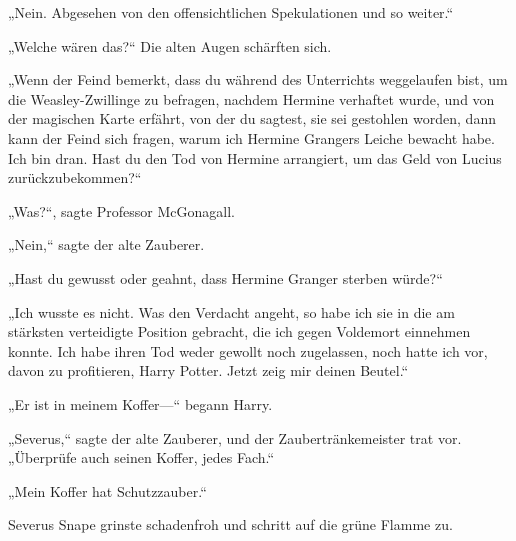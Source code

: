 „Nein. Abgesehen von den offensichtlichen Spekulationen und so weiter.“

„Welche wären das?“
Die alten Augen schärften sich.

„Wenn der Feind bemerkt, dass du während des Unterrichts weggelaufen bist, um die Weasley-Zwillinge zu befragen, nachdem Hermine verhaftet wurde, und von der magischen Karte erfährt, von der du sagtest, sie sei gestohlen worden, dann kann der Feind sich fragen, warum ich Hermine Grangers Leiche bewacht habe. Ich bin dran. Hast du den Tod von Hermine arrangiert, um das Geld von Lucius zurückzubekommen?“

„Was?“, sagte Professor McGonagall.

„Nein,“ sagte der alte Zauberer.

„Hast du gewusst oder geahnt, dass Hermine Granger sterben würde?“

„Ich wusste es nicht. Was den Verdacht angeht, so habe ich sie in die am stärksten verteidigte Position gebracht, die ich gegen Voldemort einnehmen konnte. Ich habe ihren Tod weder gewollt noch zugelassen, noch hatte ich vor, davon zu profitieren, Harry Potter. Jetzt zeig mir deinen Beutel.“

„Er ist in meinem Koffer—“ begann Harry.

„Severus,“ sagte der alte Zauberer, und der Zaubertränkemeister trat vor. „Überprüfe auch seinen Koffer, jedes Fach.“

„Mein Koffer hat Schutzzauber.“

Severus Snape grinste schadenfroh und schritt auf die grüne Flamme zu.

